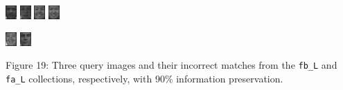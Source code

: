 \documentclass[ 12pt ]{article}
\begin{document}
\begin{enumerate}
\begin{enumerate}
                \begin{center}
                    \includegraphics[scale=5]{f_l_images/AnyConv.com__00183_940128_fb}
                    \includegraphics[scale=5]{f_l_images/AnyConv.com__00276_940422_fa_a}
                    \includegraphics[scale=5]{f_l_images/AnyConv.com__00451_940422_fb}
                    \includegraphics[scale=5]{f_l_images/AnyConv.com__00410_940422_fa}
                \end{center}
                \begin{center}
                    \includegraphics[scale=5]{f_l_images/AnyConv.com__00557_940519_fb}
                    \includegraphics[scale=5]{f_l_images/AnyConv.com__00002_940128_fa}
                \end{center}
                \begin{center}
                    \scriptsize
                    Figure 19: Three query images and their incorrect matches from the \verb|fb_L| and \verb|fa_L| collections, respectively, with 90\% information
                    preservation.
                \end{center}



\end{enumerate}
\end{enumerate}
\end{document}
